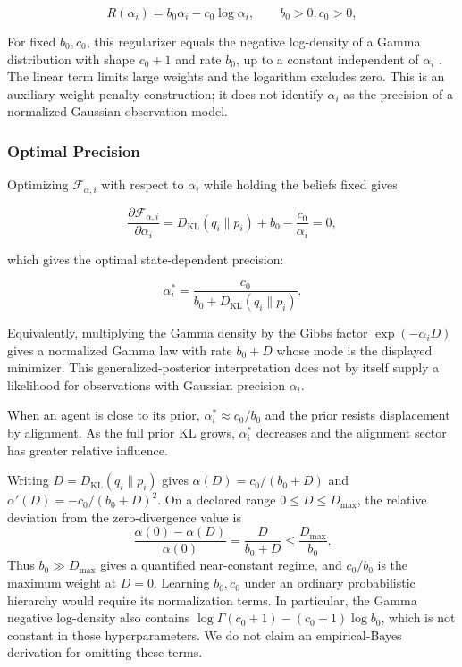 \documentclass[twoside,11pt]{article}
\begin{document}
\begin{equation}
R(\alpha_i) = b_0 \alpha_i - c_0 \log \alpha_i, \qquad b_0 > 0, c_0 > 0,
\label{eq:precision_regularizer}
\end{equation}

For fixed $b_0,c_0$, this regularizer equals the negative log-density of a Gamma distribution with shape $c_0+1$ and rate $b_0$, up to a constant independent of $\alpha_i$ \citep{Bishop2006,murphy2012machine}. The linear term limits large weights and the logarithm excludes zero. This is an auxiliary-weight penalty construction; it does not identify $\alpha_i$ as the precision of a normalized Gaussian observation model.

\subsubsection{Optimal Precision}

Optimizing $\mathcal{F}_{\alpha,i}$ with respect to $\alpha_i$ while holding the beliefs fixed gives

\begin{equation}
\frac{\partial \mathcal{F}_{\alpha,i}}{\partial \alpha_i}
= D_{\mathrm{KL}}(q_i \| p_i) + b_0 - \frac{c_0}{\alpha_i} = 0,
\end{equation}

which gives the optimal state-dependent precision:

\begin{equation}
\boxed{
\alpha_i^*
 = \frac{c_0}{b_0 + D_{\mathrm{KL}}(q_i \| p_i)}.
}
\label{eq:state_dependent_alpha}
\end{equation}

Equivalently, multiplying the Gamma density by the Gibbs factor $\exp(-\alpha_iD)$ gives a normalized Gamma law with rate $b_0+D$ whose mode is the displayed minimizer. This generalized-posterior interpretation does not by itself supply a likelihood for observations with Gaussian precision $\alpha_i$.

When an agent is close to its prior, $\alpha_i^*\approx c_0/b_0$ and the prior resists displacement by alignment. As the full prior KL grows, $\alpha_i^*$ decreases and the alignment sector has greater relative influence.

Writing $D=D_{\mathrm{KL}}(q_i\|p_i)$ gives $\alpha(D)=c_0/(b_0+D)$ and $\alpha'(D)=-c_0/(b_0+D)^2$. On a declared range $0\leq D\leq D_{\max}$, the relative deviation from the zero-divergence value is
\begin{equation}
\frac{\alpha(0)-\alpha(D)}{\alpha(0)}
=\frac{D}{b_0+D}
\leq\frac{D_{\max}}{b_0}.
\end{equation}
Thus $b_0\gg D_{\max}$ gives a quantified near-constant regime, and $c_0/b_0$ is the maximum weight at $D=0$. Learning $b_0,c_0$ under an ordinary probabilistic hierarchy would require its normalization terms. In particular, the Gamma negative log-density also contains $\log\Gamma(c_0+1)-(c_0+1)\log b_0$, which is not constant in those hyperparameters. We do not claim an empirical-Bayes derivation for omitting these terms.
\end{document}
